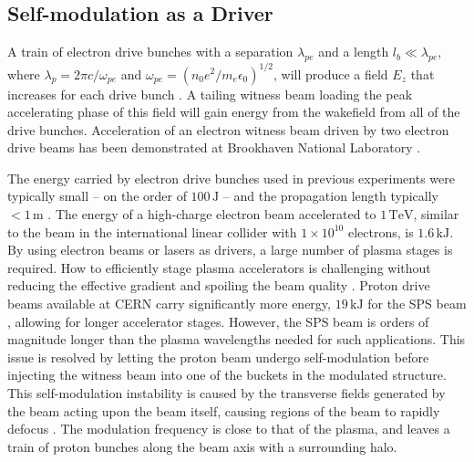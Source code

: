 \documentclass[aps,prstab,reprint,amsmath,amssymb,groupedaddress]{revtex4-1}
\newcommand{\unit}[1]{\,\mathrm{#1}}
\newcommand{\nexp}[1]{\times 10^{#1}}
\begin{document}
\subsection[\label{S:I:SMI}]{Self-modulation as a Driver}

A train of electron drive bunches with a separation $\lambda_{pe}$ and a length $l_{b} \ll \lambda_{pe}$, where
$\lambda_{p} = 2\pi c/\omega_{pe}$ and $\omega_{pe} = (n_{0} e^{2} / m_{e} \epsilon_{0})^{1/2}$,
will produce a field $E_{z}$ that increases for each drive bunch \cite{chen:1985}. A tailing witness beam loading the
peak accelerating phase of this field will gain energy from the wakefield from all of the drive bunches. Acceleration of
an electron witness beam driven by two electron drive beams has been demonstrated at Brookhaven National Laboratory
\cite{muggli:2011}.

The energy carried by electron drive bunches used in previous experiments were typically small -- on the order of
$100\unit{J}$ -- and the propagation length typically $<1\unit{m}$ \cite{blumenfeld:2007,caldwell:2009}. The energy of a
high-charge electron beam accelerated to $1\unit{TeV}$, similar to the beam in the international linear collider with
$1\nexp{10}$ electrons, is $1.6\unit{kJ}$. By using electron beams or lasers as drivers, a large number of plasma stages
is required. How to efficiently stage plasma accelerators is challenging without reducing the effective gradient and
spoiling the beam quality \cite{steinke:2016,lindstrom:2016}. Proton drive beams available at CERN carry significantly
more energy, $19\unit{kJ}$ for the SPS beam \cite{gschwendtner:2016}, allowing for longer accelerator stages. However,
the SPS beam is orders of magnitude longer than the plasma wavelengths needed for such applications. This issue is
resolved by letting the proton beam undergo self-modulation before injecting the witness beam into one of the buckets in
the modulated structure. This self-modulation instability is caused by the transverse fields generated by the beam
acting upon the beam itself, causing regions of the beam to rapidly defocus \cite{kumar:2010}. The modulation frequency
is close to that of the plasma, and leaves a train of proton bunches along the beam axis with a surrounding halo.
\end{document}
